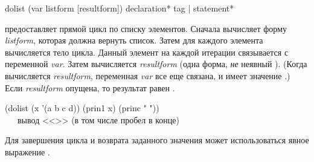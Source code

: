 \begin{defmac}
dolist (var listform [resultform])
       {declaration}* {tag | statement}*

 предоставляет прямой цикл по списку элементов.
Сначала 
вычисляет форму \emph{listform}, которая должна вернуть список.
Затем для каждого элемента вычисляется тело цикла. Данный элемент на каждой
итерации связывается с переменной \emph{var}.
Затем вычисляется \emph{resultform} (одна форма, \emph{не} неявный ).
(Когда вычисляется \emph{resultform}, переменная \emph{var} все еще связана, и
имеет значение {\nil}.)
Если \emph{resultform} опущена, то результат равен {\false}.
\begin{lisp}
(dolist (x '(a b c d)) (prin1 x) (princ " ")) \EV\ {\false} \\
~~~\textrm{вывод <<>> (в том числе пробел в конце)}
\end{lisp}
Для завершения цикла и возврата заданного значения может использоваться явное
выражение .
\end{defmac}

